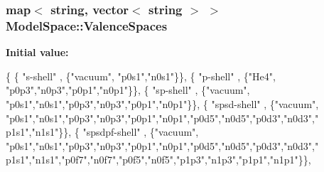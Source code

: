 \subsubsection[{\texorpdfstring{Valence\+Spaces}{ValenceSpaces}}]{\setlength{\rightskip}{0pt plus 5cm}map$<$ string, vector$<$ string $>$ $>$ Model\+Space\+::\+Valence\+Spaces\hspace{0.3cm}{\ttfamily [static]}}\hypertarget{classModelSpace_a049236b9745687355390da2ad8977052}{}\label{classModelSpace_a049236b9745687355390da2ad8977052}
{\bfseries Initial value\+:}
\begin{DoxyCode}
\{
\{ \textcolor{stringliteral}{"s-shell"}  ,         \{\textcolor{stringliteral}{"vacuum"}, \textcolor{stringliteral}{"p0s1"},\textcolor{stringliteral}{"n0s1"}\}\},
\{ \textcolor{stringliteral}{"p-shell"}  ,         \{\textcolor{stringliteral}{"He4"}, \textcolor{stringliteral}{"p0p3"},\textcolor{stringliteral}{"n0p3"},\textcolor{stringliteral}{"p0p1"},\textcolor{stringliteral}{"n0p1"}\}\},
\{ \textcolor{stringliteral}{"sp-shell"}  ,        \{\textcolor{stringliteral}{"vacuum"}, \textcolor{stringliteral}{"p0s1"},\textcolor{stringliteral}{"n0s1"},\textcolor{stringliteral}{"p0p3"},\textcolor{stringliteral}{"n0p3"},\textcolor{stringliteral}{"p0p1"},\textcolor{stringliteral}{"n0p1"}\}\},
\{ \textcolor{stringliteral}{"spsd-shell"}  ,      \{\textcolor{stringliteral}{"vacuum"}, \textcolor{stringliteral}{"p0s1"},\textcolor{stringliteral}{"n0s1"},\textcolor{stringliteral}{"p0p3"},\textcolor{stringliteral}{"n0p3"},\textcolor{stringliteral}{"p0p1"},\textcolor{stringliteral}{"n0p1"},\textcolor{stringliteral}{"p0d5"},\textcolor{stringliteral}{"n0d5"},\textcolor{stringliteral}{"p0d3"},\textcolor{stringliteral}{"n0d3"},\textcolor{stringliteral}{"
      p1s1"},\textcolor{stringliteral}{"n1s1"}\}\},
\{ \textcolor{stringliteral}{"spsdpf-shell"}  ,    \{\textcolor{stringliteral}{"vacuum"}, \textcolor{stringliteral}{"p0s1"},\textcolor{stringliteral}{"n0s1"},\textcolor{stringliteral}{"p0p3"},\textcolor{stringliteral}{"n0p3"},\textcolor{stringliteral}{"p0p1"},\textcolor{stringliteral}{"n0p1"},\textcolor{stringliteral}{"p0d5"},\textcolor{stringliteral}{"n0d5"},\textcolor{stringliteral}{"p0d3"},\textcolor{stringliteral}{"n0d3"},\textcolor{stringliteral}{"
      p1s1"},\textcolor{stringliteral}{"n1s1"},\textcolor{stringliteral}{"p0f7"},\textcolor{stringliteral}{"n0f7"},\textcolor{stringliteral}{"p0f5"},\textcolor{stringliteral}{"n0f5"},\textcolor{stringliteral}{"p1p3"},\textcolor{stringliteral}{"n1p3"},\textcolor{stringliteral}{"p1p1"},\textcolor{stringliteral}{"n1p1"}\}\},

\end{DoxyCode}
